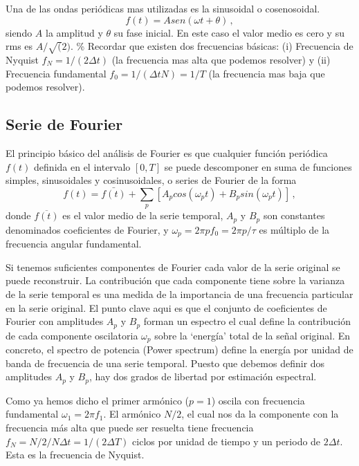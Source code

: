 \documentclass[
]{agujournal2019}
\begin{document}
Una de las ondas periódicas mas utilizadas es la sinusoidal o
cosenosoidal. \[f(t)=A sen(\omega t + \theta)\,,\] siendo \(A\) la
amplitud y \(\theta\) su fase inicial. En este caso el valor medio es
cero y su rms es \(A/\sqrt(2)\). \% Recordar que existen dos frecuencias
básicas: (i) Frecuencia de Nyquist \(f_N=1/(2\Delta t)\) (la frecuencia
mas alta que podemos resolver) y (ii) Frecuencia fundamental
\(f_0=1/(\Delta t N)=1/T\) (la frecuencia mas baja que podemos
resolver).

\vspace{0.25cm}

\hypertarget{serie-de-fourier}{%
\subsection{Serie de Fourier}\label{serie-de-fourier}}

El principio básico del análisis de Fourier es que cualquier función
periódica \(f(t)\) definida en el intervalo \([0,T]\) se puede
descomponer en suma de funciones simples, sinusoidales y cosinusoidales,
o series de Fourier de la forma
\[f(t)=\bar{f(t)} + \sum\limits_p [A_p cos(\omega_p t) + B_p sin (\omega_p t)]\,,\]
donde \(\overline{f(t)}\) es el valor medio de la serie temporal,
\(A_p\) y \(B_p\) son constantes denominados coeficientes de Fourier, y
\(\omega_p=2 \pi p f_0=2\pi p/\tau\) es múltiplo de la frecuencia
angular fundamental.

Si tenemos suficientes componentes de Fourier cada valor de la serie
original se puede reconstruir. La contribución que cada componente tiene
sobre la varianza de la serie temporal es una medida de la importancia
de una frecuencia particular en la serie original. El punto clave aqui
es que el conjunto de coeficientes de Fourier con amplitudes \(A_p\) y
\(B_p\) forman un espectro el cual define la contribución de cada
componente oscilatoria \(\omega_p\) sobre la `energía' total de la señal
original. En concreto, el spectro de potencia (Power spectrum) define la
energía por unidad de banda de frecuencia de una serie temporal. Puesto
que debemos definir dos amplitudes \(A_p\) y \(B_p\), hay dos grados de
libertad por estimación espectral.

Como ya hemos dicho el primer armónico (\(p=1\)) oscila con frecuencia
fundamental \(\omega_1=2\pi f_1\). El armónico \(N/2\), el cual nos da
la componente con la frecuencia más alta que puede ser resuelta tiene
frecuencia \(f_N=N/2/N\Delta t=1/(2\Delta T)\) ciclos por unidad de
tiempo y un periodo de \(2\Delta t\). Esta es la frecuencia de Nyquist.
\end{document}
